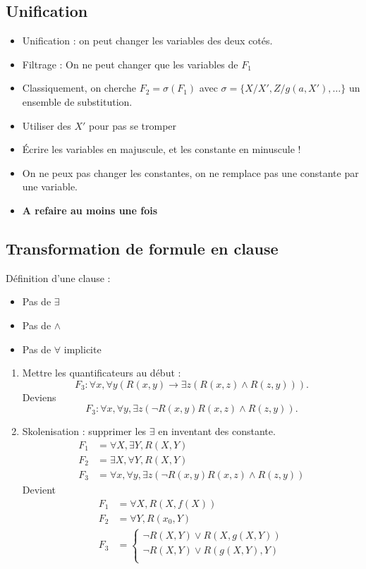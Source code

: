 \documentclass{article}
\theoremstyle{plain}%
\theoremstyle{definition}
\theoremstyle{remark}
\begin{document}
\subsection{Unification}
\begin{itemize}
    \item Unification : on peut changer les variables des deux cotés. 
    \item Filtrage : On ne peut changer que les variables de $ F_1 $ 
    \item Classiquement, on cherche $ F_2 = \sigma (F_1) $ avec $ \sigma = \{X/X', Z/g(a, X'), \dots \}$ un ensemble de substitution.
    \item Utiliser des $ X \prime  $ pour pas se tromper
    \item Écrire les variables en majuscule, et les constante en minuscule !
    \item On ne peux pas changer les constantes, on ne remplace pas une constante par une variable.
    \item \textbf{A refaire au moins une fois}
\end{itemize}

\subsection{Transformation de formule en clause}
Définition d'une clause : 
\begin{itemize}
    \item Pas de $ \exists  $ 
    \item Pas de $ \wedge  $ 
    \item Pas de $ \forall  $ implicite
\end{itemize}
\begin{enumerate}
    \item Mettre les quantificateurs au début : 
    \[
        F_3 : \forall x, \forall y (R(x,y) \to \exists z (R(x,z) \wedge R(z,y)))
    .\]
    Deviens 
    \[
        F_3 : \forall x, \forall y, \exists z (\neg R(x,y) R(x,z) \wedge R(z,y))
    .\]
    \item Skolenisation : supprimer les $ \exists  $ en inventant des constante. \begin{align*}
        F_1 &= \forall X, \exists Y, R(X,Y) \\
        F_2 &= \exists X, \forall Y, R(X,Y) \\
        F_3 &= \forall x, \forall y, \exists z (\neg R(x,y) R(x,z) \wedge R(z,y))
    \end{align*}
    Devient \begin{align*}
        F_1 &= \forall X, R(X, f(X)) \\
        F_2 &= \forall Y, R(x_0, Y) \\
        F_3 &= \begin{cases}
        \neg R(X,Y) \vee R(X, g(X,Y)) \\
        \neg R(X,Y) \vee R(g(X,Y), Y) \\
        \end{cases} 
    \end{align*}
\end{enumerate}
\end{document}
